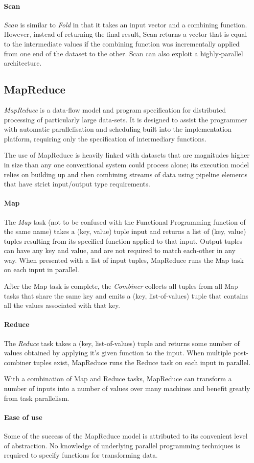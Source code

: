 \paragraph{Scan}
\emph{Scan} is similar to \emph{Fold} in that it takes an input vector and a combining function. However, instead of returning the final result, Scan returns a vector that is equal to the intermediate values if the combining function was incrementally applied from one end of the dataset to the other. Scan can also exploit a highly-parallel architecture.
\subsection{MapReduce}
\emph{MapReduce} is a data-flow model and program specification for distributed processing of particularly large data-sets\cite{mapreduce}. It is designed to assist the programmer with automatic parallelisation and scheduling built into the implementation platform, requiring only the specification of intermediary functions.

The use of MapReduce is heavily linked with datasets that are magnitudes higher in size than any one conventional system could process alone; its execution model relies on building up and then combining streams of data using pipeline elements that have strict input/output type requirements.
\paragraph{Map}
The \emph{Map} task (not to be confused with the Functional Programming function of the same name) takes a (key, value) tuple input and returns a list of (key, value) tuples resulting from its specified function applied to that input. Output tuples can have any key and value, and are not required to match each-other in any way. When presented with a list of input tuples, MapReduce runs the Map task on each input in parallel.

After the Map task is complete, the \emph{Combiner} collects all tuples from all Map tasks that share the same key and emits a (key, list-of-values) tuple that contains all the values associated with that key.
\paragraph{Reduce}
The \emph{Reduce} task takes a (key, list-of-values) tuple and returns some number of values obtained by applying it's given function to the input. When multiple post-combiner tuples exist, MapReduce runs the Reduce task on each input in parallel.

With a combination of Map and Reduce tasks, MapReduce can transform a number of inputs into a number of values over many machines and benefit greatly from task parallelism.

\paragraph{Ease of use}
Some of the success of the MapReduce model is attributed to its convenient level of abstraction. No knowledge of underlying parallel programming techniques is required to specify functions for transforming data.

